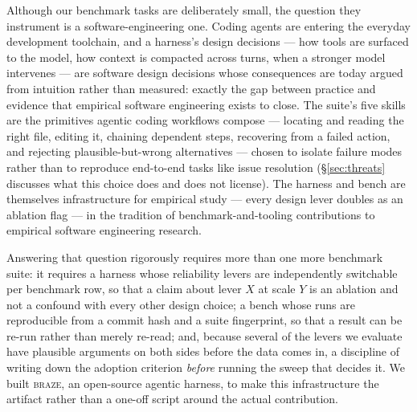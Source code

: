 \documentclass[smallcondensed,natbib]{svjour3}
\newcommand{\braze}{\textsc{braze}}
\begin{document}
Although our benchmark tasks are deliberately small, the question they
instrument is a software-engineering one. Coding agents are entering
the everyday development toolchain, and a harness's design decisions
--- how tools are surfaced to the model, how context is compacted
across turns, when a stronger model intervenes --- are software design
decisions whose consequences are today argued from intuition rather
than measured: exactly the gap between practice and evidence that
empirical software engineering exists to close. The suite's five
skills are the primitives agentic coding workflows compose ---
locating and reading the right file, editing it, chaining dependent
steps, recovering from a failed action, and rejecting
plausible-but-wrong alternatives --- chosen to isolate failure modes
rather than to reproduce end-to-end tasks like issue resolution
(\S\ref{sec:threats} discusses what this choice does and does not
license). The harness and bench are themselves infrastructure for
empirical study --- every design lever doubles as an ablation flag ---
in the tradition of benchmark-and-tooling contributions to empirical
software engineering research.

Answering that question rigorously requires more than one more
benchmark suite: it requires a harness whose reliability levers are
independently switchable per benchmark row, so that a claim about lever
$X$ at scale $Y$ is an ablation and not a confound with every other
design choice; a bench whose runs are reproducible from a commit hash
and a suite fingerprint, so that a result can be re-run rather than
merely re-read; and, because several of the levers we evaluate have
plausible arguments on both sides before the data comes in, a discipline
of writing down the adoption criterion \emph{before} running the sweep
that decides it. We built \braze{}, an open-source agentic harness, to
make this infrastructure the artifact rather than a one-off script
around the actual contribution.
\end{document}
